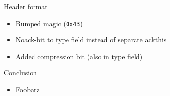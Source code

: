 \documentclass{beamer}
\begin{document}
\begin{frame}{Header format}
\begin{itemize}
\item Bumped magic (\texttt{0x43})
\item Noack-bit to type field instead of separate ackthis
\item Added compression bit (also in type field)
\end{itemize}
\end{frame}

\begin{frame}{Conclusion}
\begin{itemize}
\item Foobarz
\end{itemize}
\end{frame}
\end{document}
